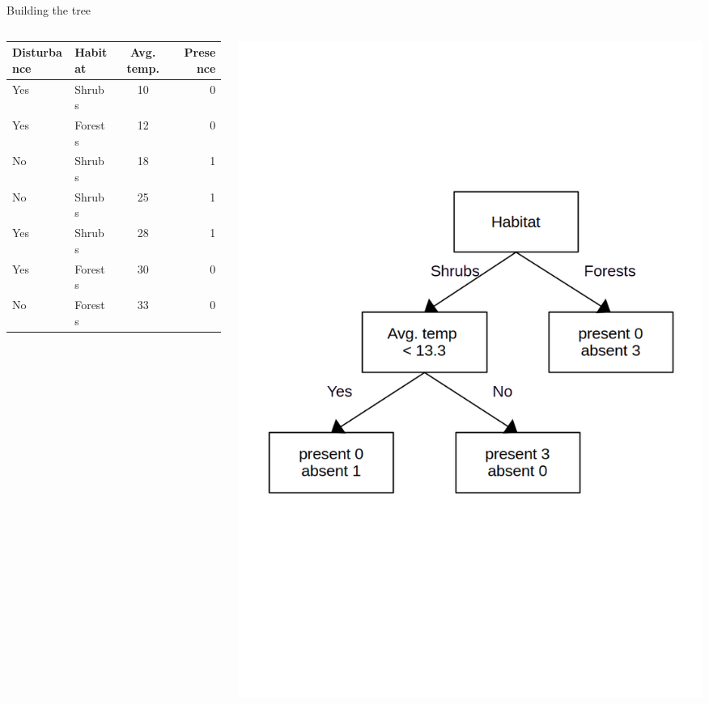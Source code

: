 \documentclass{irdbeamer}
\begin{document}
\begin{frame}{Building the tree}
\begin{columns}
    \begin{column}{0.5\textwidth}
\centering
{\footnotesize
\begin{tabular}{llc|r}
    \toprule
    Disturbance & Habitat & Avg. temp. & Presence \\
    \midrule
    Yes & Shrubs    & 10 & 0 \\
    Yes & Forests   & 12 & 0 \\
    No  & Shrubs    & 18 & 1 \\
    No  & Shrubs    & 25 & 1 \\
    Yes & Shrubs    & 28 & 1 \\
    Yes & Forests   & 30 & 0 \\
    No  & Forests   & 33 & 0 \\
    \bottomrule
\end{tabular}
        }
    \end{column}
    \begin{column}{0.5\textwidth}
\centering
    \includegraphics[width=.8\textwidth]{./figs/schemas/tree.png}%
\end{column}
\end{columns}
\end{frame}
\end{document}
